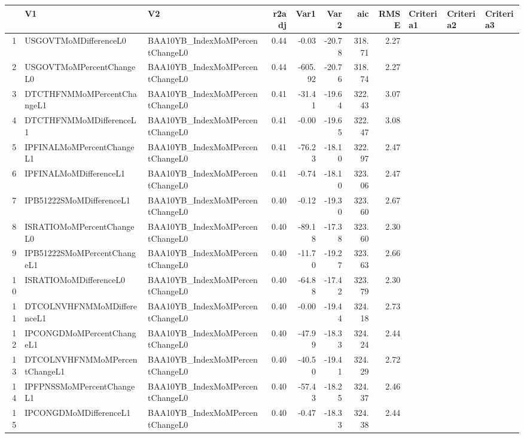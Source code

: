 \begin{longtable}{rllrrrrrlll}
  \hline
 & V1 & V2 & r2adj & Var1 & Var2 & aic & RMSE & Criteria1 & Criteria2 & Criteria3 \\ 
  \hline
1 & USGOVTMoMDifferenceL0 & BAA10YB\_IndexMoMPercentChangeL0 & 0.44 & -0.03 & -20.78 & 318.71 & 2.27 &  &  &  \\ 
  2 & USGOVTMoMPercentChangeL0 & BAA10YB\_IndexMoMPercentChangeL0 & 0.44 & -605.92 & -20.76 & 318.74 & 2.27 &  &  &  \\ 
  3 & DTCTHFNMMoMPercentChangeL1 & BAA10YB\_IndexMoMPercentChangeL0 & 0.41 & -31.41 & -19.64 & 322.43 & 3.07 &  &  &  \\ 
  4 & DTCTHFNMMoMDifferenceL1 & BAA10YB\_IndexMoMPercentChangeL0 & 0.41 & -0.00 & -19.65 & 322.47 & 3.08 &  &  &  \\ 
  5 & IPFINALMoMPercentChangeL1 & BAA10YB\_IndexMoMPercentChangeL0 & 0.41 & -76.23 & -18.10 & 322.97 & 2.47 &  &  &  \\ 
  6 & IPFINALMoMDifferenceL1 & BAA10YB\_IndexMoMPercentChangeL0 & 0.41 & -0.74 & -18.10 & 323.06 & 2.47 &  &  &  \\ 
  7 & IPB51222SMoMDifferenceL1 & BAA10YB\_IndexMoMPercentChangeL0 & 0.40 & -0.12 & -19.30 & 323.60 & 2.67 &  &  &  \\ 
  8 & ISRATIOMoMPercentChangeL0 & BAA10YB\_IndexMoMPercentChangeL0 & 0.40 & -89.18 & -17.38 & 323.60 & 2.30 &  &  &  \\ 
  9 & IPB51222SMoMPercentChangeL1 & BAA10YB\_IndexMoMPercentChangeL0 & 0.40 & -11.70 & -19.27 & 323.63 & 2.66 &  &  &  \\ 
  10 & ISRATIOMoMDifferenceL0 & BAA10YB\_IndexMoMPercentChangeL0 & 0.40 & -64.88 & -17.42 & 323.79 & 2.30 &  &  &  \\ 
  11 & DTCOLNVHFNMMoMDifferenceL1 & BAA10YB\_IndexMoMPercentChangeL0 & 0.40 & -0.00 & -19.44 & 324.18 & 2.73 &  &  &  \\ 
  12 & IPCONGDMoMPercentChangeL1 & BAA10YB\_IndexMoMPercentChangeL0 & 0.40 & -47.99 & -18.33 & 324.24 & 2.44 &  &  &  \\ 
  13 & DTCOLNVHFNMMoMPercentChangeL1 & BAA10YB\_IndexMoMPercentChangeL0 & 0.40 & -40.50 & -19.41 & 324.29 & 2.72 &  &  &  \\ 
  14 & IPFPNSSMoMPercentChangeL1 & BAA10YB\_IndexMoMPercentChangeL0 & 0.40 & -57.43 & -18.25 & 324.37 & 2.46 &  &  &  \\ 
  15 & IPCONGDMoMDifferenceL1 & BAA10YB\_IndexMoMPercentChangeL0 & 0.40 & -0.47 & -18.33 & 324.38 & 2.44 &  &  &  \\ 

\end{longtable}
